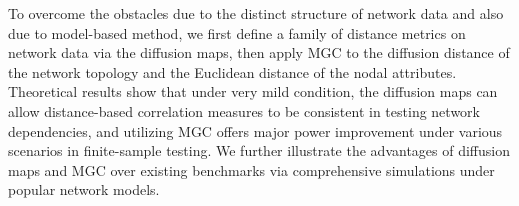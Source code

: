 \documentclass[11pt]{article}
\theoremstyle{definition}
\begin{document}
To overcome the obstacles due to the distinct structure of network data and also due to model-based method, we first define a family of distance metrics on network data via the diffusion maps, then apply MGC to the diffusion distance of the network topology and the Euclidean distance of the nodal attributes. Theoretical results show that under very mild condition, the diffusion maps can allow distance-based correlation measures to be consistent in testing network dependencies, and utilizing MGC offers major power improvement under various scenarios in finite-sample testing. We further illustrate the advantages of diffusion maps and MGC over existing benchmarks via comprehensive simulations under popular network models.


	\vspace*{-0.2cm}
\end{document}
